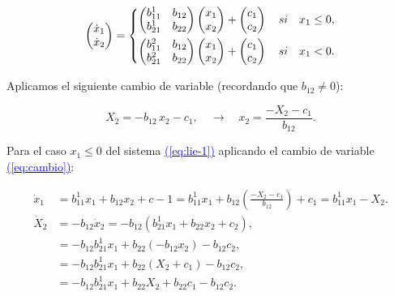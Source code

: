 \documentclass[12pt,a4paper]{report} %
\newcommand{\eref}[1]{\hyperref[#1]{\textcolor{blue}{(\ref*{#1})}}}
\begin{document}
	\begin{equation}
		\begin{pmatrix*}[r]
			\dot{x}_1 \\ \dot{x}_2
		\end{pmatrix*}=
		\label{eq:lie-1}
		\scalebox{1}{$\displaystyle
			\left\{
			\begin{aligned}
				\begin{pmatrix*}[r]
					b_{11}^1 & b_{12} \\
					b_{21}^1 & b_{22}
				\end{pmatrix*}\begin{pmatrix*}[r]
				x_1\\x_2
				\end{pmatrix*}+\begin{pmatrix*}[r]
				c_1 \\ c_2
				\end{pmatrix*} \quad si \quad x_1 \leq 0, \\
				\begin{pmatrix*}[r]
					b_{11}^2 & b_{12} \\
					b_{21}^2 & b_{22}
				\end{pmatrix*}\begin{pmatrix*}[r]
				x_1\\x_2
				\end{pmatrix*}+\begin{pmatrix*}[r]
					c_1 \\ c_2
				\end{pmatrix*} \quad si \quad x_1 < 0.
			\end{aligned}
			\right.
			$}
	\end{equation}\smallskip
	
	\noindent Aplicamos el siguiente cambio de variable (recordando que $b_{12}\neq0$): 
	
	\begin{equation}
		\label{eq:cambio}
		X_2=-b_{12}\,x_2-c_1,\quad \rightarrow \quad x_2=\frac{-X_2-c_1}{b_{12}}.
	\end{equation}\smallskip

	\noindent Para el caso $x_1\leq 0$ del sistema \eref{eq:lie-1} aplicando el cambio de variable \eref{eq:cambio}:
	
	\begin{equation}
		\label{eq:q1}
	\begin{aligned}
		\dot{x}_1&=b_{11}^1x_1+b_{12}x_2+c-1=b_{11}^1x_1+b_{12}\left(\frac{-X_2-c_1}{b_{12}}\right)+c_1=b_{11}^1x_1-X_2. \\[2mm]
		\dot{X}_2&=-b_{12}\dot{x}_2=-b_{12}\left(b_{21}^1x_1+b_{22}x_2+c_2\right), \\[2mm]
		&=-b_{12}b_{21}^1x_1+b_{22}\left(-b_{12}x_2\right)-b_{12}c_2,  \\[2mm]
		&=-b_{12}b_{21}^1x_1+b_{22}\left(X_2+c_1\right)-b_{12}c_2, \\[2mm]
		&=-b_{12}b_{21}^1x_1+b_{22}X_2+b_{22}c_1-b_{12}c_2.
	\end{aligned}
	\end{equation}\smallskip
	
\end{document}
